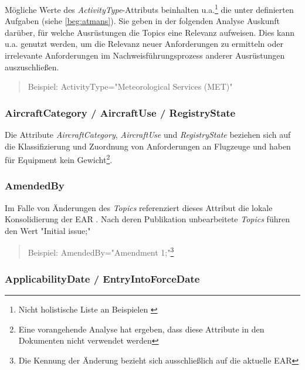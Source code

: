     Mögliche Werte des \textit{ActivityType}-Attributs beinhalten u.a.\footnote{Nicht holistische Liste an Beispielen \cite[vgl.][S.18 -- 19]{easa_xml_doc}} die unter \atmans definierten Aufgaben (siehe \ref{beg:atmans}).
    Sie geben in der folgenden Analyse Auskunft darüber, für welche \atmans Ausrüstungen die Topics eine Relevanz aufweisen.
    Dies kann u.a. genutzt werden, um die Relevanz neuer Anforderungen zu ermitteln oder irrelevante Anforderungen im Nachweisführungsprozess anderer Ausrüstungen auszuschließen.  
    
    \begin{quote}
        Beispiel:
        \textsf{ActivityType="Meteorological Services (MET)"}
    \end{quote}
   
\subsubsection{AircraftCategory / AircraftUse / RegistryState}
    
    Die Attribute \textit{AircraftCategory}, \textit{AircraftUse} und \textit{RegistryState} beziehen sich auf die Klassifizierung und Zuordnung von Anforderungen an Flugzeuge und haben für \atmans Equipment kein Gewicht\footnote{Eine vorangehende Analyse hat ergeben, dass diese Attribute in den \atmans Dokumenten nicht verwendet werden}. \cite[20, 21, 26]{easa_xml_doc}
    
\subsubsection{AmendedBy}

    Im Falle von Änderungen des \textit{Topics} referenziert dieses Attribut die lokale Konsolidierung der \ac{EAR}
    \cite[21]{easa_xml_doc}.
    Nach deren Publikation unbearbeitete \textit{Topics} führen den Wert \textsf{"{}Initial issue;"}
    
    \begin{quote}
        Beispiel:
        \textsf{AmendedBy="{}Amendment 1;"}\footnote{Die Kennung der Änderung bezieht sich ausschließlich auf die aktuelle \ac{EAR}}
    \end{quote}
    
\subsubsection{ApplicabilityDate / EntryIntoForceDate }

